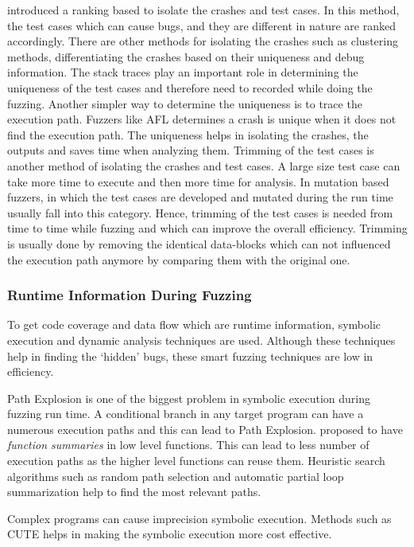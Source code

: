  introduced a ranking based to isolate the crashes and test cases\cite{chen2013taming}.
In this method, the test cases which can cause bugs, and they are different in nature are ranked accordingly.
There are other methods for isolating the crashes such as clustering methods, differentiating the crashes based
on their uniqueness and debug information. The stack traces play an important role in determining the uniqueness
of the test cases and therefore need to recorded while doing the fuzzing. Another simpler way to determine the
uniqueness is to trace the execution path. Fuzzers like AFL\cite{GitHubgo92:online} determines a crash is unique
when it does not find the execution path. The uniqueness helps in isolating the crashes, the outputs and saves
time when analyzing them. Trimming of the test cases is another method of isolating the crashes and test cases.
A large size test case can take more time to execute and then more time for analysis. In mutation based fuzzers,
in which the test cases are developed and mutated during the run time usually fall into this category. Hence, trimming
of the test cases is needed from time to time while fuzzing and which can improve the overall efficiency. Trimming
is usually done by removing the identical data-blocks which can not influenced the execution path anymore
by comparing them with the original one.

\subsubsection{Runtime Information During Fuzzing}
To get code coverage and data flow which are runtime information,  symbolic execution and dynamic
analysis techniques are used. Although these techniques help in finding the `hidden' bugs, these smart
fuzzing techniques are low in efficiency.


Path Explosion is one of the biggest problem in symbolic execution during fuzzing run time. A conditional branch
in any target program can have a numerous execution paths and this can lead to Path Explosion.
 proposed to have \textit{function summaries} in low level
functions. This can lead to less number of execution paths as the higher level functions can
reuse them\cite{godefroid2007compositional}. Heuristic search algorithms such as random path selection
and automatic partial loop summarization help to find the most relevant paths\cite{liang2018fuzzing}.

Complex programs can cause imprecision symbolic execution. Methods such as CUTE\cite{sen2005cute} helps
in making the symbolic execution more cost effective.

